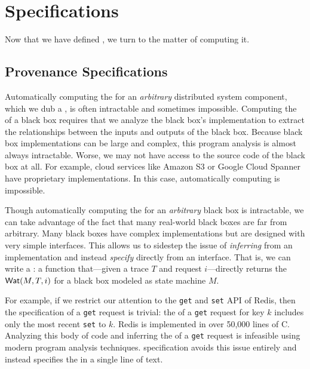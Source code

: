 \section{\WatProvenance{} Specifications}
Now that we have defined \watprovenance{}, we turn to the matter of computing it.

\subsection{Provenance Specifications}
Automatically computing the \watprovenance{} for an \emph{arbitrary}
distributed system component, which we dub a , is often
intractable and sometimes impossible. Computing the \watprovenance{} of a black
box requires that we analyze the black box's implementation to extract the
relationships between the inputs and outputs of the black box. Because black
box implementations can be large and complex, this program analysis is almost
always intractable. Worse, we may not have access to the source code of the
black box at all. For example, cloud services like Amazon S3 or Google Cloud
Spanner have proprietary implementations. In this case, automatically computing
\watprovenance{} is impossible.

\newcommand{\kvget}{\texttt{get}}
\newcommand{\kvset}{\texttt{set}}

Though automatically computing the \watprovenance{} for an \emph{arbitrary}
black box is intractable, we can take advantage of the fact that many
real-world black boxes are far from arbitrary. Many black boxes have complex
implementations but are designed with very simple interfaces. This allows us
to sidestep the issue of \emph{inferring} \watprovenance{} from an
implementation and instead \emph{specify} \watprovenance{} directly from an
interface. That is, we can write a : a
function that---given a trace $T$ and request $i$---directly returns the
\watprovenance{} $\textsf{Wat}(M, T, i)$ for a black box modeled as state machine $M$.

For example, if we restrict our attention to the \kvget{} and \kvset{} API of
Redis, then the \watprovenance{} specification of a \kvget{} request is
trivial: the \watprovenance{} of a \kvget{} request for key $k$
includes only the most recent \kvset{} to $k$. Redis is implemented in over
50,000 lines of C. Analyzing this body of code and inferring the
\watprovenance{} of a \kvget{} request is infeasible using modern program
analysis techniques. \Watprovenance{} specification avoids this issue entirely
and instead specifies the \watprovenance{} in a single line of text.

